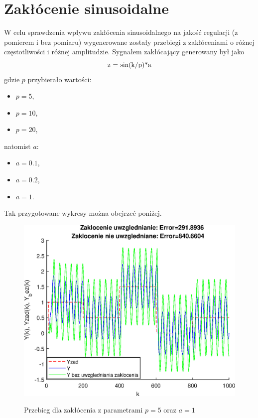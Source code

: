\chapter{Zakłócenie sinusoidalne}
W celu sprawdzenia wpływu zakłócenia sinusoidalnego na jakość regulacji (z pomierem i bez pomiaru) wygenerowane zostały przebiegi z zakłóceniami o różnej częstotliwości i różnej amplitudzie. Sygnałem zakłócający generowany był jako
\begin{equation}
	$z = sin(k/p)*a$
\end{equation}
gdzie $p$ przybierało wartości:
\begin{itemize}
	\item $p=5$,
	\item $p=10$,
	\item $p=20$,
\end{itemize}
natomist $a$:
\begin{itemize}
	\item $a=0.1$,
	\item $a=0.2$,
	\item $a=1$.
\end{itemize}
Tak przygotowane wykresy można obejrzeć poniżej.
\begin{figure}[h!]
	\centering
	\includegraphics[scale=1]{Rys/sin5_1}
	\label{fig:sin5_1}
	\caption{Przebieg dla zakłócenia z parametrami $p=5$ oraz $a=1$}
\end{figure}

